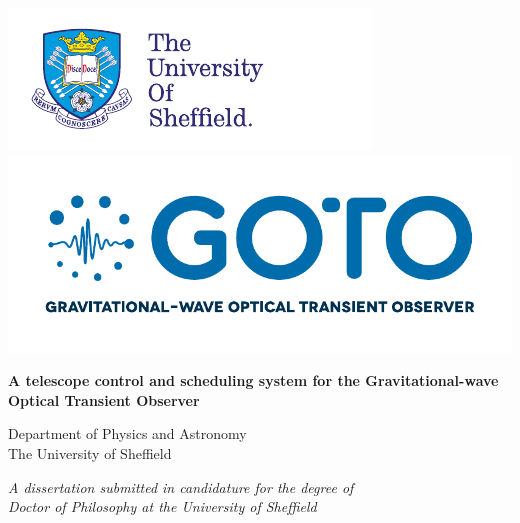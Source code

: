 \begin{center}
    \includegraphics[width=0.45\linewidth]{./images/UoS_logo.pdf}
    \includegraphics[width=0.45\linewidth]{./images/GOTO_logo.pdf}

    \vspace*{2.5cm}

    \begin{Huge}
        \textbf{A telescope control and
               scheduling system for the
               Gravitational-wave Optical Transient Observer
               }
    \end{Huge}

    \vspace*{2.5cm}

    \begin{LARGE}
    \end{LARGE}

    \vspace*{1cm}

    \begin{Large}
        Department of Physics and Astronomy \\
        \smallskip
        The University of Sheffield
    \end{Large}



    \vspace*{2.5cm}

    \begin{large}
        \textit{A dissertation submitted in candidature for the degree of} \\
        \textit{Doctor of Philosophy at the University of Sheffield}
    \end{large}

    \vspace*{1cm}

    \begin{large}
        \text{\today}
    \end{large}

    \vfill
\end{center}
